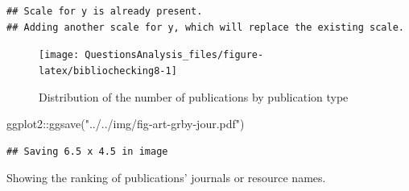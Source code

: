 \documentclass[
]{article}
\newenvironment{Shaded}{\begin{snugshade}}{\end{snugshade}}
\newcommand{\AttributeTok}[1]{\textcolor[rgb]{0.77,0.63,0.00}{#1}}
\newcommand{\FunctionTok}[1]{\textcolor[rgb]{0.00,0.00,0.00}{#1}}
\newcommand{\NormalTok}[1]{#1}
\newcommand{\OtherTok}[1]{\textcolor[rgb]{0.56,0.35,0.01}{#1}}
\newcommand{\SpecialCharTok}[1]{\textcolor[rgb]{0.00,0.00,0.00}{#1}}
\newcommand{\StringTok}[1]{\textcolor[rgb]{0.31,0.60,0.02}{#1}}
\begin{document}
\begin{verbatim}
## Scale for y is already present.
## Adding another scale for y, which will replace the existing scale.
\end{verbatim}

\begin{figure}

{\centering \texttt{[image: QuestionsAnalysis\_files/figure-latex/bibliochecking8-1]} 

}

\caption{Distribution of the number of publications by publication type}\label{fig:bibliochecking8}
\end{figure}

\begin{Shaded}
\begin{Highlighting}[]
\NormalTok{ggplot2}\SpecialCharTok{::}\FunctionTok{ggsave}\NormalTok{(}\StringTok{"../../img/fig{-}art{-}grby{-}jour.pdf"}\NormalTok{)}
\end{Highlighting}
\end{Shaded}

\begin{verbatim}
## Saving 6.5 x 4.5 in image
\end{verbatim}

Showing the ranking of publications' journals or resource names.

\begin{Shaded}
\end{Shaded}
\end{document}
